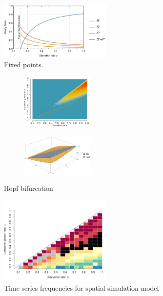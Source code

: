 \documentclass[11pt]{article}
\begin{document}





\begin{figure}[h!]
	\centering
	\includegraphics[width=0.5\textwidth]{fig_FP.pdf}
	\caption{
	Fixed points.
	}
	\label{fig_FP}
\end{figure}


\begin{figure}[h!]
	\begin{subfigure}
		\centering
		\includegraphics[width=0.4\textwidth]{fig_Hopf.pdf}
	\end{subfigure}
	\begin{subfigure}
		\centering
		\includegraphics[width=0.4\textwidth]{fig_Hopf3D.pdf}
	\end{subfigure}
	\caption{
		Hopf bifurcation
	}
	\label{fig_Hopf}
\end{figure}



\begin{figure}[h!]
	\centering
	\includegraphics[width=0.5\textwidth]{fig_freqsim.pdf}
	\caption{
	Time series frequencies for spatial simulation model
	}
	\label{fig_FreqSim}
\end{figure}
\end{document}
